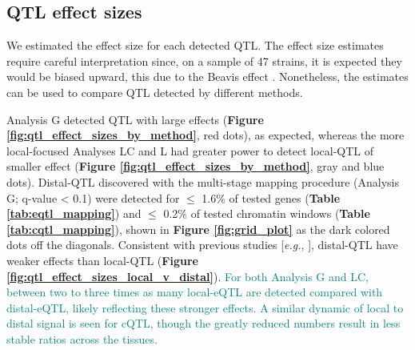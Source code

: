\documentclass[9pt,twocolumn,twoside]{gsajnl}
\newcommand{\eg}{\emph{e.g.}\xspace}
\newcommand{\WV}[2]{\textcolor{red}{#1\footnote{\textcolor{red}{WV: #2}}}}
\newcommand{\GKinline}[1]{\textcolor{teal}{#1}}
\begin{document}
\subsection{QTL effect sizes}

We estimated the effect size for each detected QTL. The effect size estimates require careful interpretation since, on a sample of 47 strains, it is expected they would be biased upward, this due to the Beavis effect \citep{Keele2019}. Nonetheless, the estimates can be used to compare QTL detected by different methods.

Analysis G detected QTL with large effects (\textbf{Figure \ref{fig:qtl_effect_sizes_by_method}}, red dots), as expected, whereas the more local-focused Analyses LC and L had greater power to detect local-QTL of smaller effect (\textbf{Figure \ref{fig:qtl_effect_sizes_by_method}}, gray and blue dots). Distal-QTL discovered with the multi-stage mapping procedure (Analysis G; q-value < 0.1) were detected for $\leq$ 1.6\% of tested genes (\textbf{Table \ref{tab:eqtl_mapping}}) and $\leq$ 0.2\% of tested chromatin windows (\textbf{Table \ref{tab:cqtl_mapping}}), shown in \textbf{Figure \ref{fig:grid_plot}} as the dark colored dots off the diagonals. Consistent with previous studies [\eg, \citet{Chick2016}], distal-QTL have weaker effects than local-QTL (\textbf{Figure \ref{fig:qtl_effect_sizes_local_v_distal}}).
\GKinline{For both Analysis G and LC, between two to three times as many local-eQTL are detected compared with
distal-eQTL, likely reflecting these stronger effects. A similar dynamic of local to distal signal is seen for cQTL, though the greatly reduced numbers result in less stable ratios across the tissues.}
\end{document}
